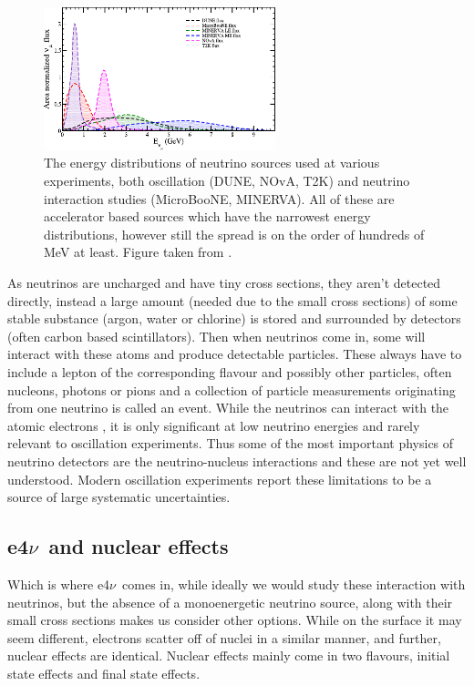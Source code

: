 \documentclass[a4paper,12pt]{article}
\newcommand{\efn}{e4$\nu$}
\begin{document}
\begin{figure}[H]
    \centering
    \includegraphics[width=0.6\textwidth]{figures/sourceEnergies.pdf}
    \caption{
        The energy distributions of neutrino sources used at various experiments, both oscillation (DUNE, NOvA, T2K) and neutrino interaction studies (MicroBooNE, MINERVA).
        All of these are accelerator based sources which have the narrowest energy distributions, however still the spread is on the order of hundreds of \si{MeV} at least.
        Figure taken from \cite{sajjadatharNeutrinosTheirInteractions2023}.
    }\label{fig:neu_s_Es}
\end{figure}

As neutrinos are uncharged and have tiny cross sections, they aren't detected directly, instead a large amount (needed due to the small cross sections) of some stable substance (argon, water or chlorine) is stored and surrounded by detectors (often carbon based scintillators).
Then when neutrinos come in, some will interact with these atoms and produce detectable particles.
These always have to include a lepton of the corresponding flavour and possibly other particles, often nucleons, photons or pions and a collection of particle measurements originating from one neutrino is called an event.
While the neutrinos can interact with the atomic electrons \cite{whittinghamScatteringLowEnergy2022}, it is only significant at low neutrino energies and rarely relevant to oscillation experiments.
Thus some of the most important physics of neutrino detectors are the neutrino-nucleus interactions and these are not yet well understood.
Modern oscillation experiments report these limitations to be a source of large systematic uncertainties\cite{abeConstraintMatterAntimatter2020,novacollaborationNewConstraintsOscillation2018}.

\subsection{\efn\ and nuclear effects}
Which is where \efn\ comes in, while ideally we would study these interaction with neutrinos, but the absence of a monoenergetic neutrino source, along with their small cross sections makes us consider other options.
While on the surface it may seem different, electrons scatter off of nuclei in a similar manner, and further, nuclear effects are identical.
Nuclear effects mainly come in two flavours, initial state effects and final state effects.
\end{document}

